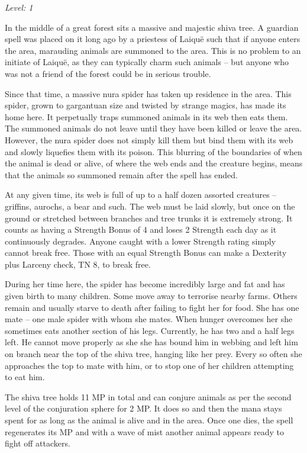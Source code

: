 \begin{multicols}{2}
\textit{Level: 1}

In the middle of a great forest sits a massive and majestic shiva tree.
A guardian spell was placed on it long ago by a priestess of Laiqu\"{e} such that if anyone enters the area, marauding animals are summoned to the area.
This is no problem to an initiate of Laiqu\"{e}, as they can typically charm such animals -- but anyone who was not a friend of the forest could be in serious trouble.

Since that time, a massive nura spider has taken up residence in the area.  This spider, grown to gargantuan size and twisted by strange magics, has made its home here.  It perpetually traps summoned animals in its web then eats them.  The summoned animals do not leave until they have been killed or leave the area.  However, the nura spider does not simply kill them but bind them with its web and slowly liquefies them with its poison.  This blurring of the boundaries of when the animal is dead or alive, of where the web ends and the creature begins, means that the animals so summoned remain after the spell has ended.

At any given time, its web is full of up to a half dozen assorted creatures -- griffins, aurochs, a bear and such.  The web must be laid slowly, but once on the ground or stretched between branches and tree trunks it is extremely strong.  It counts as having a Strength Bonus of 4 and loses 2 Strength each day as it continuously degrades.  Anyone caught with a lower Strength rating simply cannot break free.  Those with an equal Strength Bonus can make a Dexterity plus Larceny check, TN 8, to break free.

During her time here, the spider has become incredibly large and fat and has given birth to many children.  Some move away to terrorise nearby farms.  Others remain and usually starve to death after failing to fight her for food.  She has one mate -- one male spider with whom she mates.  When hunger overcomes her she sometimes eats another section of his legs.  Currently, he has two and a half legs left.  He cannot move properly as she she has bound him in webbing and left him on branch near the top of the shiva tree, hanging like her prey.  Every so often she approaches the top to mate with him, or to stop one of her children attempting to eat him.

The shiva tree holds 11 MP in total and can conjure animals as per the second level of the conjuration sphere for 2 MP.  It does so and then the mana stays spent for as long as the animal is alive and in the area.  Once one dies, the spell regenerates its MP and with a wave of mist another animal appears ready to fight off attackers.


\end{multicols}

